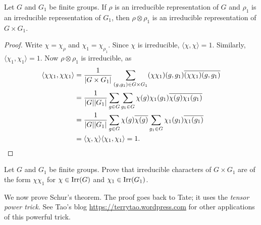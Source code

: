 \begin{lemma}
    Let $G$ and $G_1$ be finite groups. If $\rho$ is an irreducible
    representation of $G$ and $\rho_1$ is an irreducible representation
    of $G_1$, then 
    $\rho\otimes\rho_1$ is an irreducible representation of $G\times G_1$. 
\end{lemma}

\begin{proof}
    Write $\chi=\chi_{\rho}$ and $\chi_1=\chi_{\rho_1}$. Since
    $\chi$ is irreducible, $\langle\chi,\chi\rangle=1$. Similarly, 
    $\langle\chi_1,\chi_1\rangle=1$. Now
    $\rho\otimes\rho_1$ is irreducible, as 
    \begin{align*}
    \langle\chi\chi_1,\chi\chi_1\rangle
    &=\frac{1}{|G\times G_1|}\sum_{(g,g_1)\in G\times G_1}(\chi\chi_1)(g,g_1)\overline{(\chi\chi_1)(g,g_1)}\\
    &=\frac{1}{|G||G_1|}\sum_{g\in G}\sum_{g_1\in G}\chi(g)\chi_1(g_1)\overline{\chi(g)}\overline{\chi_1(g_1)}\\
    &=\frac{1}{|G||G_1|}\sum_{g\in G}\chi(g)\overline{\chi(g)}\sum_{g_1\in G}\chi_1(g_1)\overline{\chi_1(g_1)}\\
    &=\langle\chi,\chi\rangle\langle\chi_1,\chi_1\rangle=1.\qedhere 
    \end{align*}
\end{proof}

\begin{exercise}
    Let $G$ and $G_1$ be finite groups. 
    Prove that irreducible characters of $G\times G_1$ 
    are of the form $\chi\chi_1$ for  
    $\chi\in\operatorname{Irr}(G)$ and $\chi_1\in\operatorname{Irr}(G_1)$. 
\end{exercise}

We now prove Schur's theorem. The proof goes back to Tate; it uses the 
\emph{tensor power trick}. See
Tao's blog  
\url{https://terrytao.wordpress.com} for other applications of this powerful
trick. 

